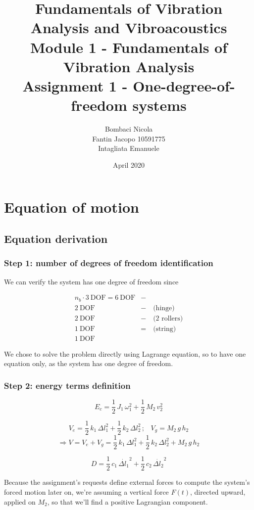 \documentclass[a4paper,12pt,oneside]{article}
\title{Fundamentals of Vibration Analysis and Vibroacoustics \\
Module 1 - Fundamentals of Vibration Analysis \\
Assignment 1 - One-degree-of-freedom systems}
\author{Bombaci Nicola \\
Fantin Jacopo 10591775 \\
Intagliata Emanuele}
\date{April 2020}
\begin{document}
\maketitle

\section{Equation of motion}

\subsection{Equation derivation}

\subsubsection*{Step 1: number of degrees of freedom identification}

We can verify the system has one degree of freedom since

\[ \begin{split}
n_b \cdot 3 ~ \text{DOF} = 6 ~ \text{DOF} & - \\
2 ~ \text{DOF} & - \quad \text{(hinge)} \\
2 ~ \text{DOF}  & - \quad \text{(2 rollers)} \\
1 ~ \text{DOF} & = \quad \text{(string)} \\
1 ~ \text{DOF}
\end{split} \]

We chose to solve the problem directly using Lagrange equation, so to have one equation only, as the system has one degree of freedom.

\subsubsection*{Step 2: energy terms definition}

\[ E_c = \frac{1}{2} \, J_1 \, \omega_1^2 + \frac{1}{2} \, M_2 \, v_2^2 \]

\[
V_e = \frac{1}{2} \, k_1 \, \Delta l_1^2 + \frac{1}{2} \, k_2 \, \Delta l_2^2 \, \text{;} %
\quad V_g = M_2 \, g \, h_2
\]
\[
\Rightarrow V = V_e + V_g = \frac{1}{2} \, k_1 \, \Delta l_1^2 + \frac{1}{2} \, k_2 \, \Delta l_2^2 + %
M_2 \, g \, h_2
\]

\[ D = \frac{1}{2} \, c_1 \, \dot{\Delta l_1}^2 + \frac{1}{2} \, c_2 \, \dot{\Delta l_2}^2 \]

Because the assignment's requests define external forces to compute the system's forced motion later on, we're assuming a vertical force $ F(t) $, directed upward, applied on $ M_2 $, so that we'll find a positive Lagrangian component.
\end{document}
